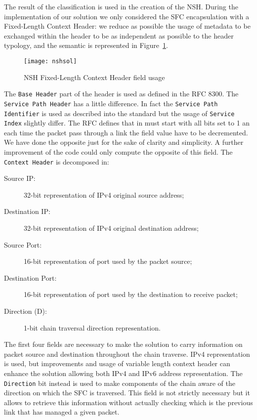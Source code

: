 The result of the classification is used in the creation of the NSH. During the
implementation of our solution we only considered the SFC encapsulation with a
Fixed-Length Context Header: we reduce as possible the usage of metadata to be
exchanged within the header to be as independent as possible to the header
typology, and the semantic is represented in Figure~\ref{chap:impl:img:nsh}.

\begin{figure}
  \centering \texttt{[image: nshsol]}
  \caption{NSH Fixed-Length Context Header field usage}
  \label{chap:impl:img:nsh}
\end{figure}

The \texttt{Base Header} part of the header is used as defined in the RFC 8300.
The \texttt{Service Path Header} has a little difference. In fact the 
\texttt{Service Path Identifier} is used as described into the standard but the
usage of \texttt{Service Index} slightly differ. The RFC defines that in must
start with all bits set to 1 an each time the packet pass through a link the
field value have to be decremented. We have done the opposite just for the sake
of clarity and simplicity. A further improvement of the code could only compute
the opposite of this field. The \texttt{Context Header} is decomposed in:
\begin{description}
  \item[Source IP:] 32-bit representation of IPv4 original source address;
  \item[Destination IP:] 32-bit representation of IPv4 original destination
  address;
  \item[Source Port:] 16-bit representation of port used by the packet source;
  \item[Destination Port:] 16-bit representation of port used by the destination
  to receive packet;
  \item[Direction (D):] 1-bit chain traversal direction representation.
\end{description}
The first four fields are necessary to make the solution to carry information on
packet source and destination throughout the chain traverse. IPv4
representation is used, but improvements and usage of variable length context
header can enhance the solution allowing both IPv4 and IPv6 address
representation. The \texttt{Direction} bit instead is used to make components of
the chain aware of the direction on which the SFC is traversed. This field is
not strictly necessary but it allows to retrieve this information without
actually checking which is the previous link that has managed a given packet. 

